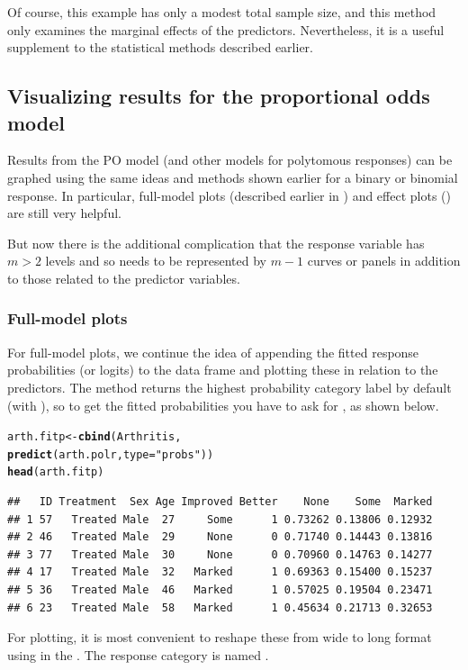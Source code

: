 \documentclass[11pt]{book}\usepackage[]{graphicx}\usepackage[]{color}
\makeatletter
\newcommand{\hlstr}[1]{\textcolor[rgb]{0.192,0.494,0.8}{#1}}%
\newcommand{\hlstd}[1]{\textcolor[rgb]{0.345,0.345,0.345}{#1}}%
\newcommand{\hlkwb}[1]{\textcolor[rgb]{0.69,0.353,0.396}{#1}}%
\newcommand{\hlkwc}[1]{\textcolor[rgb]{0.333,0.667,0.333}{#1}}%
\newcommand{\hlkwd}[1]{\textcolor[rgb]{0.737,0.353,0.396}{\textbf{#1}}}%
\newenvironment{kframe}{%
 \def\at@end@of@kframe{}%
 \ifinner\ifhmode%
  \def\at@end@of@kframe{\end{minipage}}%
  \begin{minipage}{\columnwidth}%
 \fi\fi%
 \def\FrameCommand##1{\hskip\@totalleftmargin \hskip-\fboxsep
 \colorbox{shadecolor}{##1}\hskip-\fboxsep
     \hskip-\linewidth \hskip-\@totalleftmargin \hskip\columnwidth}%
 \MakeFramed {\advance\hsize-\width
   \@totalleftmargin\z@ \linewidth\hsize
   \@setminipage}}%
 {\par\unskip\endMakeFramed%
 \at@end@of@kframe}
\newenvironment{knitrout}{}{} %
\renewenvironment{knitrout}{\small\renewcommand{\baselinestretch}{.85}}{} %
\makeatother
\begin{document}
Of course, this example has only a modest total sample size, and this method
only examines the marginal effects of the predictors.  Nevertheless, it is
a useful supplement to the statistical methods described earlier.


\subsection{Visualizing results for the proportional odds model}\label{sec:vis-propodds}
Results from the PO model (and other models for polytomous responses)
can be graphed using the same ideas and methods shown
earlier for a binary or binomial response.  In particular,
full-model plots (described earlier in ) and effect plots
() are still very helpful. 

But now there is the additional complication that the response variable has $m > 2$
levels and so needs to be represented by $m-1$ curves or panels
in addition to those related to the predictor variables.

\subsubsection{Full-model plots}\label{sec:po-fullplots}
For full-model plots, we continue the idea of appending the fitted response probabilities
(or logits) to the data frame and plotting these in relation to the predictors.
The  method returns the highest probability category label by default
(with ),
so to get the fitted probabilities you have to ask for , as shown below.

\begin{knitrout}
\color{fgcolor}\begin{kframe}
\begin{alltt}
\hlstd{arth.fitp} \hlkwb{<-} \hlkwd{cbind}\hlstd{(Arthritis,}
                  \hlkwd{predict}\hlstd{(arth.polr,} \hlkwc{type}\hlstd{=}\hlstr{"probs"}\hlstd{))}
\hlkwd{head}\hlstd{(arth.fitp)}
\end{alltt}
\begin{verbatim}
##   ID Treatment  Sex Age Improved Better    None    Some  Marked
## 1 57   Treated Male  27     Some      1 0.73262 0.13806 0.12932
## 2 46   Treated Male  29     None      0 0.71740 0.14443 0.13816
## 3 77   Treated Male  30     None      0 0.70960 0.14763 0.14277
## 4 17   Treated Male  32   Marked      1 0.69363 0.15400 0.15237
## 5 36   Treated Male  46   Marked      1 0.57025 0.19504 0.23471
## 6 23   Treated Male  58   Marked      1 0.45634 0.21713 0.32653
\end{verbatim}
\end{kframe}
\end{knitrout}
For plotting, it is most convenient to reshape these from wide to long format
using  in the .  The response category is named
.
\end{document}
